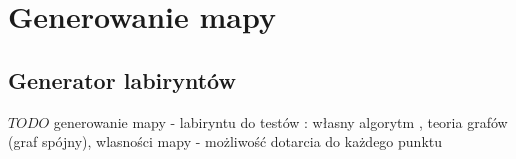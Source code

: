 \chapter{Generowanie mapy}
\label{ch:mazegen}

\section{Generator labiryntów}
$TODO$ generowanie mapy - labiryntu do testów : własny algorytm , teoria grafów (graf spójny), wlasności mapy - możliwość dotarcia do każdego punktu

